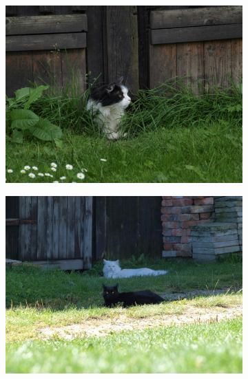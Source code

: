 \begin{figure}[H]
	\centering
    \begin{subfigure}{0.32\textwidth}
   	  \centering
      \includegraphics[scale=1.0]{obrazky/ORIGlecian.jpg}
    \end{subfigure}
    \begin{subfigure}{.32\textwidth}
      \centering
      \includegraphics[scale=1.0]{obrazky/ORIGkocky.jpg}
    \end{subfigure}
    \begin{subfigure}{.32\textwidth}
      \centering

\end{subfigure}
\end{figure}
